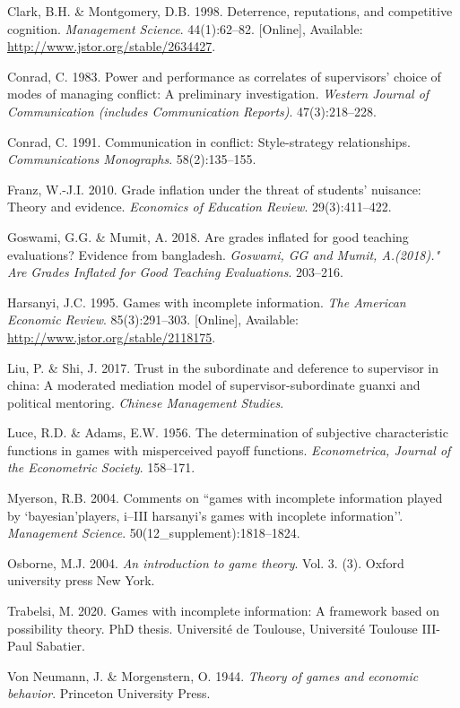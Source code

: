 \documentclass[11pt,preprint, authoryear]{elsarticle}
\numberwithin{equation}{section}
\numberwithin{figure}{section}
\numberwithin{table}{section}
\newlength{\cslhangindent}
\newenvironment{CSLReferences}%
  {\setlength{\parindent}{3pt}%
  \everypar{\setlength{\hangindent}{\cslhangindent}}\ignorespaces}%
  {\par}
\begin{document}
\hypertarget{refs}{}
\begin{CSLReferences}{1}{0}
\leavevmode\hypertarget{ref-deter}{}%
Clark, B.H. \& Montgomery, D.B. 1998. Deterrence, reputations, and
competitive cognition. \emph{Management Science}. 44(1):62--82.
{[}Online{]}, Available: \url{http://www.jstor.org/stable/2634427}.

\leavevmode\hypertarget{ref-power}{}%
Conrad, C. 1983. Power and performance as correlates of supervisors'
choice of modes of managing conflict: A preliminary investigation.
\emph{Western Journal of Communication (includes Communication
Reports)}. 47(3):218--228.

\leavevmode\hypertarget{ref-comm}{}%
Conrad, C. 1991. Communication in conflict: Style-strategy
relationships. \emph{Communications Monographs}. 58(2):135--155.

\leavevmode\hypertarget{ref-2010grade}{}%
Franz, W.-J.I. 2010. Grade inflation under the threat of students'
nuisance: Theory and evidence. \emph{Economics of Education Review}.
29(3):411--422.

\leavevmode\hypertarget{ref-2018grades}{}%
Goswami, G.G. \& Mumit, A. 2018. Are grades inflated for good teaching
evaluations? Evidence from bangladesh. \emph{Goswami, GG and Mumit,
A.(2018)." Are Grades Inflated for Good Teaching Evaluations}. 203--216.

\leavevmode\hypertarget{ref-harsanyi}{}%
Harsanyi, J.C. 1995. Games with incomplete information. \emph{The
American Economic Review}. 85(3):291--303. {[}Online{]}, Available:
\url{http://www.jstor.org/stable/2118175}.

\leavevmode\hypertarget{ref-trust}{}%
Liu, P. \& Shi, J. 2017. Trust in the subordinate and deference to
supervisor in china: A moderated mediation model of
supervisor-subordinate guanxi and political mentoring. \emph{Chinese
Management Studies}.

\leavevmode\hypertarget{ref-luce1956}{}%
Luce, R.D. \& Adams, E.W. 1956. The determination of subjective
characteristic functions in games with misperceived payoff functions.
\emph{Econometrica, Journal of the Econometric Society}. 158--171.

\leavevmode\hypertarget{ref-2004com}{}%
Myerson, R.B. 2004. Comments on ``games with incomplete information
played by `bayesian'players, i--III harsanyi's games with incoplete
information''. \emph{Management Science}. 50(12\_supplement):1818--1824.

\leavevmode\hypertarget{ref-book}{}%
Osborne, M.J. 2004. \emph{An introduction to game theory}. Vol. 3. (3).
Oxford university press New York.

\leavevmode\hypertarget{ref-2020games}{}%
Trabelsi, M. 2020. Games with incomplete information: A framework based
on possibility theory. PhD thesis. Universit{é} de Toulouse,
Universit{é} Toulouse III-Paul Sabatier.

\leavevmode\hypertarget{ref-von}{}%
Von Neumann, J. \& Morgenstern, O. 1944. \emph{Theory of games and
economic behavior}. Princeton University Press.

\end{CSLReferences}
\end{document}
